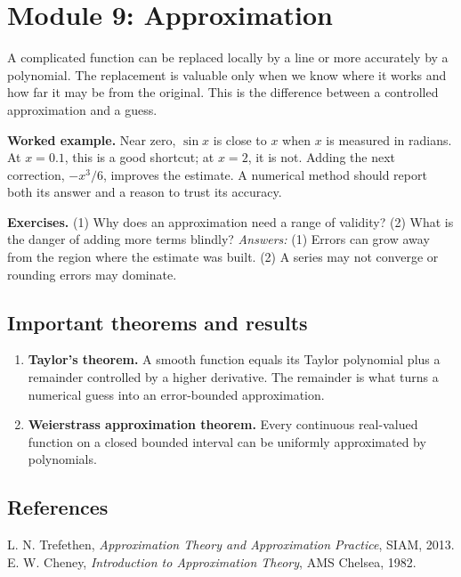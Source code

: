 \documentclass[11pt,oneside]{book}
\makeatletter
\renewenvironment{thebibliography}[1]
  {\list{\@biblabel{\@arabic\c@enumiv}}%
    {\settowidth\labelwidth{\@biblabel{#1}}%
     \leftmargin\labelwidth
     \advance\leftmargin\labelsep
     \usecounter{enumiv}%
     \let\p@enumiv\@empty
     \renewcommand\theenumiv{\@arabic\c@enumiv}}}
  {\endlist}
\makeatother
\begin{document}
\chapter[Module 9: Approximation]{Module 9: Approximation}
A complicated function can be replaced locally by a line or more accurately by a polynomial. The replacement is valuable only when we know where it works and how far it may be from the original. This is the difference between a controlled approximation and a guess.

\textbf{Worked example.} Near zero, $\sin x$ is close to $x$ when $x$ is measured in radians. At $x=0.1$, this is a good shortcut; at $x=2$, it is not. Adding the next correction, $-x^3/6$, improves the estimate. A numerical method should report both its answer and a reason to trust its accuracy.

\textbf{Exercises.} (1) Why does an approximation need a range of validity? (2) What is the danger of adding more terms blindly? \emph{Answers:} (1) Errors can grow away from the region where the estimate was built. (2) A series may not converge or rounding errors may dominate.

\section*{Important theorems and results}
\begin{enumerate}[leftmargin=*,itemsep=0.35em]
\item \textbf{Taylor's theorem.} A smooth function equals its Taylor polynomial plus a remainder controlled by a higher derivative. The remainder is what turns a numerical guess into an error-bounded approximation.

\item \textbf{Weierstrass approximation theorem.} Every continuous real-valued function on a closed bounded interval can be uniformly approximated by polynomials.
\end{enumerate}

\section*{References}
\begin{thebibliography}{9}
 L. N. Trefethen, \emph{Approximation Theory and Approximation Practice}, SIAM, 2013.
 E. W. Cheney, \emph{Introduction to Approximation Theory}, AMS Chelsea, 1982.
\end{thebibliography}
\end{document}
